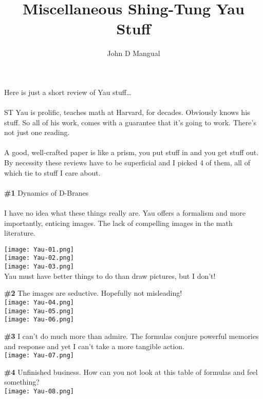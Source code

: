 \documentclass[12pt]{article}
\title{Miscellaneous Shing-Tung Yau Stuff}
\author{John D Mangual}
\date{}
\begin{document}
\selectfont \fontsize{12.5}{15}\selectfont

\maketitle

\noindent Here is just a short review of Yau stuff\dots \\ \\
ST Yau is prolific, teaches math at Harvard, for decades.  Obviously knows his stuff. So all of his work, comes with a guarantee that it's going to work.  There's not just one reading. \\ \\ 
A good, well-crafted paper is like a prism, you put stuff in and you get stuff out. By necessity these reviews have to be superficial and I picked 4 of them, all of which tie to stuff I care about. \\ \\
\textbf{\#1} Dynamics of D-Branes \\ \\
I have no idea what these things really are.  Yau offers a formalism and more importantly, enticing images.  The lack of compelling images in the math literature.  

\texttt{[image: Yau-01.png]}\\
\texttt{[image: Yau-02.png]}\\
\texttt{[image: Yau-03.png]}\\
Yau must have better things to do than draw pictures, but I don't!
\newpage

\noindent \textbf{\#2} The images are seductive.  Hopefully not misleading! \\
\texttt{[image: Yau-04.png]}\\
\texttt{[image: Yau-05.png]}\\
\texttt{[image: Yau-06.png]}\\

\newpage

\noindent \textbf{\#3} I can't do much more than admire. The formulas conjure powerful memories and response and yet I can't take a more tangible action. \\
\texttt{[image: Yau-07.png]}\\


\newpage


\noindent \textbf{\#4} Unfinished business.  How can you not look at this table of formulas and feel something? \\
\texttt{[image: Yau-08.png]}\\
\end{document}
